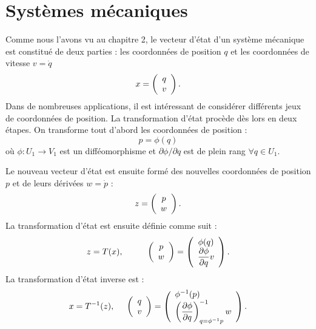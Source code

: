 \section{Systèmes mécaniques}

Comme nous l'avons vu au chapitre 2, le vecteur d'état d'un
système mécanique est constitué de deux parties : les
coordonnées de position $q$ et les coordonnées de vitesse
$v=\dot q$
$$ x = \bma{c} q \\ v \ema. $$
Dans de nombreuses applications, il est intéressant de considérer
  différents jeux de coordonnées de position.  La
transformation d'état procède dès lors en deux étapes.  On
transforme tout d'abord les coordonnées de position :
$$ p = \phi (q)$$
où $\phi : U_1 \rightarrow V_1$ est un difféomorphisme et
$\partial \phi /\partial q$ est de plein rang $\forall q \in U_1$.

Le nouveau vecteur d'état est ensuite formé des nouvelles
coordonnées de position $p$ et de leurs dérivées $w = \dot p$ :
$$
z = \bma{c} p\\w \ema.
$$
La transformation d'état est ensuite définie comme suit :
\begin{equation*} \begin{split}
 z = T(x), \hspace*{10mm} \bma{c}p\\w  \ema = \bma{c} \phi(q)\\
\dfrac{\partial \phi}{\partial q} v \ema.
\end{split} \end{equation*}
La transformation d'état inverse est :
$$
x=T^{-1}(z), \hd \bma{c}q\\v \ema = \bma{l} \phi^{-1}(p) \\
\left(\dfrac{\partial \phi}{\partial q}\right )^{-1}_{q = \phi^{-1} p}w
\ema.
$$

